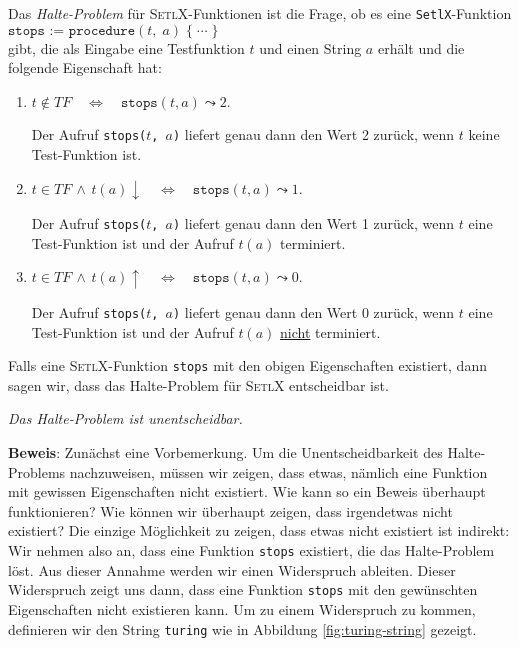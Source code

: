 \noindent
Das \emph{Halte-Problem} f\"{u}r
\textsc{SetlX}-Funktionen ist die Frage, ob es eine \texttt{SetlX}-Funktion \\[0.1cm] 
\hspace*{1.3cm} 
$\texttt{stops := procedure}(t,\;a)\; \{\;\cdots\;\}$ \\[0.1cm]
gibt, die als Eingabe eine Testfunktion $t$ und einen String $a$ erh\"{a}lt und die folgende
Eigenschaft hat:
\begin{enumerate}
\item $t \not\in T\!F \quad\Leftrightarrow\quad \mathtt{stops}(t, a) \leadsto 2$.

      Der Aufruf \texttt{stops($t$, $a$)} liefert genau dann den Wert 2 zur\"{u}ck, 
      wenn $t$ keine Test-Funktion ist.

\item $t \in T\!F \,\wedge\, t(a)\downarrow \quad\Leftrightarrow\quad
       \mathtt{stops}(t, a) \leadsto 1$.

      Der Aufruf \texttt{stops($t$, $a$)} liefert genau dann den Wert 1 zur\"{u}ck,
      wenn $t$ eine Test-Funktion ist und der Aufruf $t(a)$ terminiert.

\item $t \in T\!F \,\wedge\, t(a)\uparrow \quad\Leftrightarrow\quad
       \mathtt{stops}(t, a) \leadsto 0$.

      Der Aufruf \texttt{stops($t$, $a$)} liefert genau dann den Wert 0 zur\"{u}ck,
      wenn $t$ eine Test-Funktion ist und der Aufruf $t(a)$ \underline{nicht} terminiert.
\end{enumerate}
Falls eine \textsc{SetlX}-Funktion \texttt{stops} mit den obigen Eigenschaften existiert, dann
sagen wir, dass das Halte-Problem f\"{u}r \textsc{SetlX} entscheidbar ist.

\begin{Theorem}
{\em
  Das Halte-Problem ist unentscheidbar.
} 
\end{Theorem}

\noindent
\textbf{Beweis}:  Zun\"{a}chst eine Vorbemerkung.  Um die Unentscheidbarkeit des
Halte-Problems nachzuweisen, m\"{u}ssen wir zeigen, dass etwas, n\"{a}mlich eine Funktion mit
gewissen Eigenschaften nicht existiert.  Wie kann so ein Beweis \"{u}berhaupt funktionieren?
Wie k\"{o}nnen wir \"{u}berhaupt zeigen, dass irgendetwas nicht existiert?
Die einzige M\"{o}glichkeit zu zeigen, dass etwas nicht existiert ist indirekt:
Wir nehmen also an, dass eine Funktion \texttt{stops} existiert, die das Halte-Problem l\"{o}st.
Aus dieser Annahme werden wir einen Widerspruch ableiten.  Dieser Widerspruch zeigt
uns dann, dass eine Funktion \texttt{stops} mit den gew\"{u}nschten Eigenschaften nicht
existieren kann.
Um zu einem Widerspruch zu kommen, definieren wir den String \texttt{turing} wie in Abbildung
\ref{fig:turing-string} gezeigt.

